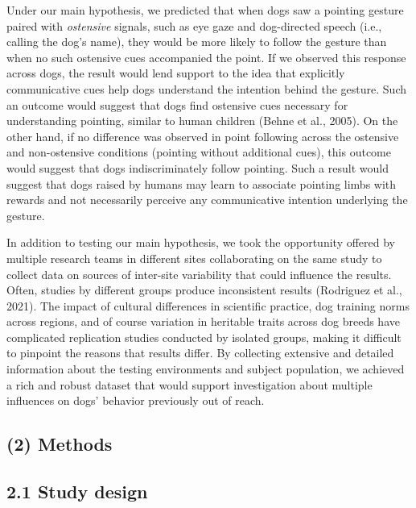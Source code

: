 \documentclass[
  man,floatsintext]{apa6}
\begin{document}
Under our main hypothesis, we predicted that when dogs saw a pointing gesture paired with \emph{ostensive} signals, such as eye gaze and dog-directed speech (i.e., calling the dog's name), they would be more likely to follow the gesture than when no such ostensive cues accompanied the point. If we observed this response across dogs, the result would lend support to the idea that explicitly communicative cues help dogs understand the intention behind the gesture. Such an outcome would suggest that dogs find ostensive cues necessary for understanding pointing, similar to human children (Behne et al., 2005). On the other hand, if no difference was observed in point following across the ostensive and non-ostensive conditions (pointing without additional cues), this outcome would suggest that dogs indiscriminately follow pointing. Such a result would suggest that dogs raised by humans may learn to associate pointing limbs with rewards and not necessarily perceive any communicative intention underlying the gesture.

In addition to testing our main hypothesis, we took the opportunity offered by multiple research teams in different sites collaborating on the same study to collect data on sources of inter-site variability that could influence the results. Often, studies by different groups produce inconsistent results (Rodriguez et al., 2021). The impact of cultural differences in scientific practice, dog training norms across regions, and of course variation in heritable traits across dog breeds have complicated replication studies conducted by isolated groups, making it difficult to pinpoint the reasons that results differ. By collecting extensive and detailed information about the testing environments and subject population, we achieved a rich and robust dataset that would support investigation about multiple influences on dogs' behavior previously out of reach.

\hypertarget{methods}{%
\subsection{(2) Methods}\label{methods}}

\hypertarget{study-design}{%
\subsection{2.1 Study design}\label{study-design}}
\end{document}
